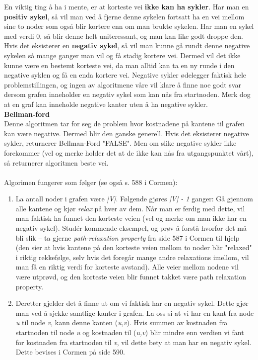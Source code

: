 \noindent En viktig ting å ha i mente, er at korteste vei \textbf{ikke kan ha sykler}. Har man en \textbf{positiv sykel}, så vil man ved å fjerne denne sykelen fortsatt ha en vei mellom sine to noder som også blir kortere enn om man brukte sykelen. Har man en sykel med verdi 0, så blir denne helt uniteressant, og man kan like godt droppe den. Hvis det eksisterer en \textbf{negativ sykel}, så vil man kunne gå rundt denne negative sykelen så mange ganger man vil og få stadig kortere vei. Dermed vil det ikke kunne være en bestemt korteste vei, da man alltid kan ta en ny runde i den negative syklen og få en enda kortere vei. Negative sykler ødelegger faktisk hele problemstillingen, og ingen av algoritmene våre vil klare å finne noe godt svar dersom grafen inneholder en negativ sykel som kan nås fra startnoden. Merk dog at en graf kan inneholde negative kanter uten å ha negative sykler.\\

\noindent\textbf{Bellman-ford}\\
Denne algoritmen tar for seg de problem hvor kostnadene på kantene til grafen kan være negative. Dermed blir den ganske generell. Hvis det eksisterer negative sykler, returnerer Bellman-Ford "FALSE". Men om slike negative sykler ikke forekommer (vel og merke holder det at de ikke kan nås fra utgangspunktet vårt), så returnerer algoritmen beste vei.
\\\\
Algorimen fungerer som følger (se også s. 588 i Cormen):
\begin{enumerate}
    \item La antall noder i grafen være \textit{|V|}. Følgende gjøres \textit{|V| - 1} ganger: Gå gjennom alle kantene og kjør \textit{relax} på hver av dem. Når man er ferdig med dette, vil man faktisk ha funnet den korteste veien (vel og merke om man ikke har en negativ sykel). Studér kommende eksempel, og prøv å forstå hvorfor det må bli slik – ta gjerne \textit{path-relaxation property} fra side 587 i Cormen til hjelp (den sier at hvis kantene på den korteste veien mellom to  noder blir "relaxed" i riktig rekkefølge, selv hvis det foregår mange andre relaxations imellom, vil man få en riktig verdi for korteste avstand). Alle veier mellom nodene vil være utprøvd, og den korteste veien blir funnet takket være path relaxation property.
    \item Deretter gjelder det å finne ut om vi faktisk har en negativ sykel. Dette gjør man ved å sjekke samtlige kanter i grafen. La oss si at vi har en kant fra node \textit{u} til node \textit{v}, kann denne kanten (\textit{u,v}). Hvis summen av kostnaden fra startnoden til node \textit{u} og kostnaden til (\textit{u,v}) blir mindre enn verdien vi fant for kostnaden fra startnoden til \textit{v}, vil dette bety at man har en negativ sykel. Dette bevises i Cormen på side 590.
\end{enumerate}

